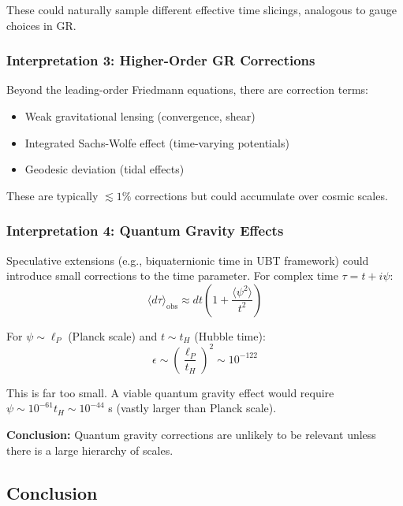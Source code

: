 These could naturally sample different effective time slicings, analogous to gauge choices in GR.

\subsubsection{Interpretation 3: Higher-Order GR Corrections}

Beyond the leading-order Friedmann equations, there are correction terms:
\begin{itemize}
    \item Weak gravitational lensing (convergence, shear)
    \item Integrated Sachs-Wolfe effect (time-varying potentials)
    \item Geodesic deviation (tidal effects)
\end{itemize}

These are typically $\lesssim 1\%$ corrections but could accumulate over cosmic scales.

\subsubsection{Interpretation 4: Quantum Gravity Effects}

Speculative extensions (e.g., biquaternionic time in UBT framework) could introduce small corrections to the time parameter. For complex time $\tau = t + i\psi$:
\begin{equation}
\langle d\tau \rangle_{\text{obs}} \approx dt \left(1 + \frac{\langle \psi^2 \rangle}{t^2}\right)
\label{eq:complex_time}
\end{equation}

For $\psi \sim \ell_P$ (Planck scale) and $t \sim t_H$ (Hubble time):
\begin{equation}
\epsilon \sim \left(\frac{\ell_P}{t_H}\right)^2 \sim 10^{-122}
\label{eq:planck_epsilon}
\end{equation}

This is far too small. A viable quantum gravity effect would require $\psi \sim 10^{-61} t_H \sim 10^{-44}$ s (vastly larger than Planck scale).

\textbf{Conclusion:} Quantum gravity corrections are unlikely to be relevant unless there is a large hierarchy of scales.

\subsection{Conclusion}

